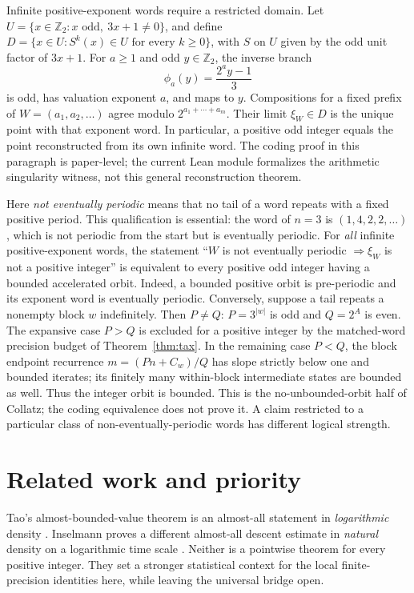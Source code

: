 \documentclass[11pt,a4paper]{article}
\newcommand{\Zp}{\mathbb{Z}_2}
\theoremstyle{definition}
\begin{document}
Infinite positive-exponent words require a restricted domain. Let
$U=\{x\in\Zp:x\text{ odd},\ 3x+1\ne0\}$, and define
$D=\{x\in U:S^k(x)\in U\text{ for every }k\ge0\}$, with $S$ on $U$
given by the odd unit factor of $3x+1$.
For $a\ge1$ and odd $y\in\Zp$, the inverse branch
\[
  \phi_a(y)=\frac{2^a y-1}{3}
\]
is odd, has valuation exponent $a$, and maps to $y$. Compositions for a
fixed prefix of $W=(a_1,a_2,\ldots)$ agree modulo
$2^{a_1+\cdots+a_m}$. Their limit $\xi_W\in D$ is the unique point
with that exponent word. In particular, a positive odd integer equals
the point reconstructed from its own infinite word. The coding proof in
this paragraph is paper-level; the current Lean module formalizes the
arithmetic singularity witness, not this general reconstruction theorem.

Here \emph{not eventually periodic} means that no tail of a word repeats
with a fixed positive period. This qualification is essential: the word
of $n=3$ is $(1,4,2,2,\ldots)$, which is not periodic from the start but
is eventually periodic. For \emph{all} infinite positive-exponent words,
the statement ``$W$ is not eventually periodic $\Longrightarrow\xi_W$
is not a positive integer'' is equivalent to every positive odd integer
having a bounded accelerated orbit. Indeed, a bounded positive orbit is
pre-periodic and its exponent word is eventually periodic. Conversely,
suppose a tail repeats a nonempty block $w$ indefinitely. Then $P\ne Q$:
$P=3^{|w|}$ is odd and $Q=2^A$ is even. The expansive case $P>Q$ is
excluded for a positive integer by the matched-word precision budget
of Theorem~\ref{thm:tax}. In the remaining case $P<Q$, the block endpoint
recurrence $m=(Pn+C_w)/Q$ has slope strictly below one and bounded
iterates; its finitely many within-block intermediate states are bounded
as well. Thus the integer orbit is bounded. This is the
no-unbounded-orbit half of Collatz; the
coding equivalence does not prove it. A claim restricted to a particular
class of non-eventually-periodic words has different logical strength.

\section{Related work and priority}

Tao's almost-bounded-value theorem is an almost-all statement in
\emph{logarithmic} density \cite{tao2019}. Inselmann proves a different
almost-all descent estimate in \emph{natural} density on a logarithmic
time scale \cite{inselmann2024}. Neither is a pointwise theorem for every
positive integer. They set a stronger statistical context for the local
finite-precision identities here, while leaving the universal bridge open.
\end{document}

